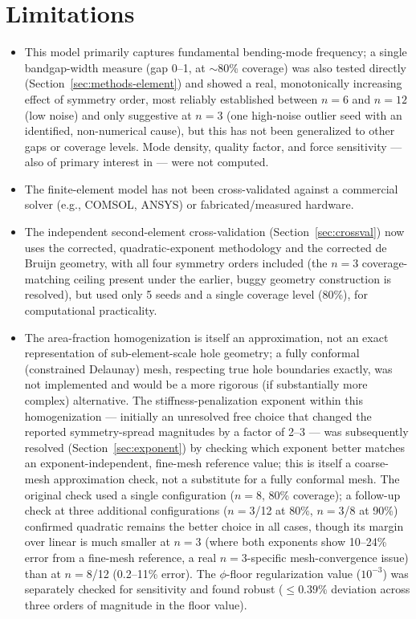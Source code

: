 \documentclass[11pt]{article}
\begin{document}
\section{Limitations}
\label{sec:limitations}

\begin{itemize}
\item This model primarily captures fundamental bending-mode frequency; a single bandgap-width measure (gap 0--1, at $\sim$80\% coverage) was also tested directly (Section~\ref{sec:methods-element}) and showed a real, monotonically increasing effect of symmetry order, most reliably established between $n=6$ and $n=12$ (low noise) and only suggestive at $n=3$ (one high-noise outlier seed with an identified, non-numerical cause), but this has not been generalized to other gaps or coverage levels. Mode density, quality factor, and force sensitivity --- also of primary interest in \cite{li2026} --- were not computed.
\item The finite-element model has not been cross-validated against a commercial solver (e.g., COMSOL, ANSYS) or fabricated/measured hardware.
\item The independent second-element cross-validation (Section~\ref{sec:crossval}) now uses the corrected, quadratic-exponent methodology and the corrected de Bruijn geometry, with all four symmetry orders included (the $n=3$ coverage-matching ceiling present under the earlier, buggy geometry construction is resolved), but used only 5 seeds and a single coverage level (80\%), for computational practicality.
\item The area-fraction homogenization is itself an approximation, not an exact representation of sub-element-scale hole geometry; a fully conformal (constrained Delaunay) mesh, respecting true hole boundaries exactly, was not implemented and would be a more rigorous (if substantially more complex) alternative. The stiffness-penalization exponent within this homogenization --- initially an unresolved free choice that changed the reported symmetry-spread magnitudes by a factor of 2--3 --- was subsequently resolved (Section~\ref{sec:exponent}) by checking which exponent better matches an exponent-independent, fine-mesh reference value; this is itself a coarse-mesh approximation check, not a substitute for a fully conformal mesh. The original check used a single configuration ($n=8$, 80\% coverage); a follow-up check at three additional configurations ($n=3$/12 at 80\%, $n=3$/8 at 90\%) confirmed quadratic remains the better choice in all cases, though its margin over linear is much smaller at $n=3$ (where both exponents show 10--24\% error from a fine-mesh reference, a real $n=3$-specific mesh-convergence issue) than at $n=8$/12 (0.2--11\% error). The $\phi$-floor regularization value ($10^{-3}$) was separately checked for sensitivity and found robust ($\leq0.39\%$ deviation across three orders of magnitude in the floor value).

\end{itemize}
\end{document}
